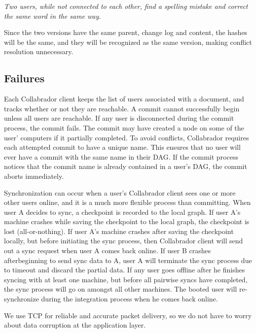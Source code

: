 \documentclass[11pt,titlepage]{article}
\begin{document}
\vspace{5mm}
\noindent
\emph{Two users, while not connected to each other, find a spelling
  mistake and correct the same word in the same way.}

\vspace{5mm}

Since the two versions have the same parent, change log and content,
the hashes will be the same, and they will be recognized as the same
version, making conflict resolution unnecessary.

\subsection{Failures}

Each Collabrador client keeps the list of users associated with a
document, and tracks whether or not they are reachable. A commit
cannot successfully begin unless all users are reachable. If any user
is disconnected during the commit process, the commit fails. The
commit may have created a node on some of the user' computers if it
partially completed. To avoid conflicts, Collabrador requires each
attempted commit to have a unique name. This ensures that no user will
ever have a commit with the same name in their DAG. If the commit
process notices that the commit name is already contained in a user's
DAG, the commit aborts immediately.

Synchronization can occur when a user's Collabrador client sees one or
more other users online, and it is a much more flexible process than
committing.  When user A decides to sync, a checkpoint is recorded to
the local graph.  If user A's machine crashes while saving the
checkpoint to the local graph, the checkpoint is lost
(all-or-nothing). If user A's machine crashes after saving the
checkpoint locally, but before initiating the sync process, then
Collabrador client will send out a sync request when user A comes back
online.  If user B crashes afterbeginning to send sync data to A, 
user A will terminate the sync process due to timeout and discard the
partial data. If any user goes offline after he finishes syncing with at least one
machine, but before all pairwise syncs have completed, the sync
process will go on amongst all other machines. The booted user will
re-synchronize during the integration process when he comes back
online.

We use TCP for reliable and accurate packet delivery, so we do not
have to worry about data corruption at the application layer. 
\end{document}
